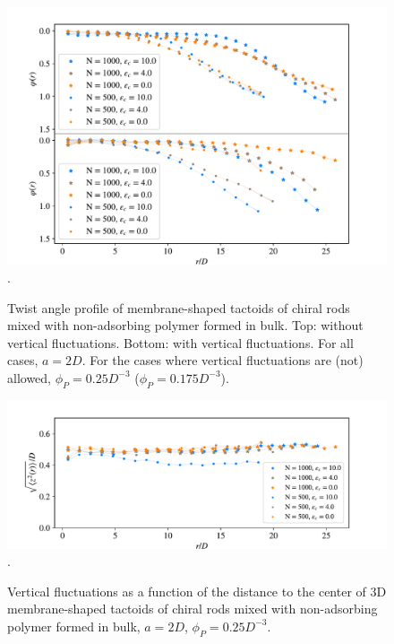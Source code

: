 \begin{figure}
\begin{center}
\includegraphics[width= .9\columnwidth]{figures/chapter-5/twistprofile}.
	\caption{Twist angle profile of membrane-shaped tactoids of chiral rods mixed with non-adsorbing polymer formed in bulk. Top: without vertical fluctuations. Bottom: with vertical fluctuations. For all cases, $a = 2D$. For the cases where vertical fluctuations are (not) allowed, $\phi_P=0.25D^{-3}$ ($\phi_P=0.175D^{-3}$). } %
 \label{twangle}
\end{center}
\end{figure}


\begin{figure}
\begin{center}
\includegraphics[width= \columnwidth]{figures/chapter-5/zstd}.
	\caption{Vertical fluctuations as a function of the distance to the center of 3D membrane-shaped tactoids of chiral rods mixed with non-adsorbing polymer formed in bulk, $a = 2D$, $\phi_P=0.25D^{-3}$. } %
\end{center}
\end{figure}





